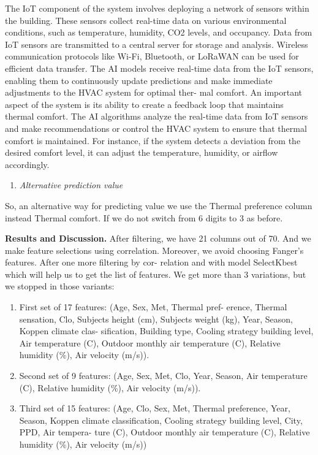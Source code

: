 The IoT component of the system involves deploying a network of sensors
within the building. These sensors collect real-time data on various
environmental conditions, such as temperature, humidity, CO2 levels, and
occupancy. Data from IoT sensors are transmitted to a central server for
storage and analysis. Wireless communication protocols like Wi-Fi,
Bluetooth, or LoRaWAN can be used for efficient data transfer. The AI
models receive real-time data from the IoT sensors, enabling them to
continuously update predictions and make immediate adjustments to the
HVAC system for optimal ther- mal comfort. An important aspect of the
system is its ability to create a feedback loop that maintains thermal
comfort. The AI algorithms analyze the real-time data from IoT sensors
and make recommendations or control the HVAC system to ensure that
thermal comfort is maintained. For instance, if the system detects a
deviation from the desired comfort level, it can adjust the temperature,
humidity, or airflow accordingly.

\begin{enumerate}
\def\labelenumi{\Alph{enumi}.}
\setcounter{enumi}{8}
\item
  \emph{Alternative prediction value}
\end{enumerate}

So, an alternative way for predicting value we use the Thermal
preference column instead Thermal comfort. If we do not switch from 6
digits to 3 as before.

{\bfseries Results and Discussion.} After filtering, we have 21 columns out
of 70. And we make feature selections using correlation. Moreover, we
avoid choosing Fanger's features. After one more filtering by cor-
relation and with model SelectKbest which will help us to get the list
of features. We get more than 3 variations, but we stopped in those
variants:

\begin{enumerate}
\def\labelenumi{\arabic{enumi})}
\item
  First set of 17 features: (Age, Sex, Met, Thermal pref- erence,
  Thermal sensation, Clo, Subjects height (cm), Subjects weight (kg),
  Year, Season, Koppen climate clas- sification, Building type, Cooling
  strategy building level, Air temperature (C), Outdoor monthly air
  temperature (C), Relative humidity (\%), Air velocity (m/s)).
\item
  Second set of 9 features: (Age, Sex, Met, Clo, Year, Season, Air
  temperature (C), Relative humidity (\%), Air velocity (m/s)).
\item
  Third set of 15 features: (Age, Clo, Sex, Met, Thermal preference,
  Year, Season, Koppen climate classification, Cooling strategy building
  level, City, PPD, Air tempera- ture (C), Outdoor monthly air
  temperature (C), Relative humidity (\%), Air velocity (m/s))
\end{enumerate}

